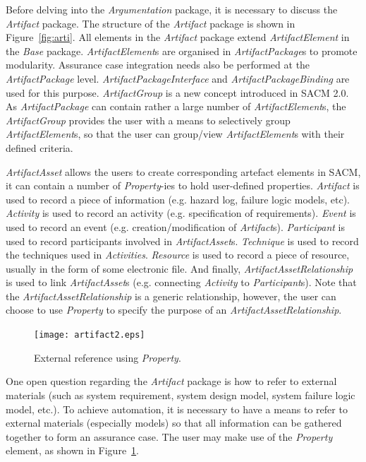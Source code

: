Before delving into the \textit{Argumentation} package, it is necessary to discuss the \textit{Artifact} package. The structure of the \textit{Artifact} package is shown in Figure~\ref{fig:arti}. 
All elements in the \textit{Artifact} package extend \textit{ArtifactElement} in the \textit{Base} package. \textit{ArtifactElement}s are organised in \textit{ArtifactPackage}s to promote modularity. 
Assurance case integration needs also be performed at the \textit{ArtifactPackage} level. 
\textit{ArtifactPackageInterface} and \textit{ArtifactPackageBinding} are used for this purpose.
\textit{ArtifactGroup} is a new concept introduced in SACM 2.0. 
As \textit{ArtifactPackage} can contain rather a large number of \textit{ArtifactElement}s, the \textit{ArtifactGroup} provides the user with a means to selectively group \textit{ArtifactElement}s, so that the user can group/view \textit{ArtifactElement}s with their defined criteria.

\textit{ArtifactAsset} allows the users to create corresponding artefact elements in SACM, it can contain a number of \textit{Property}-ies to hold user-defined properties. \textit{Artifact} is used to record a piece of information (e.g. hazard log, failure logic models, etc). 
\textit{Activity} is used to record an activity (e.g. specification of requirements). 
\textit{Event} is used to record an event (e.g. creation/modification of \textit{Artifact}s). 
\textit{Participant} is used to record participants involved in \textit{ArtifactAsset}s. 
\textit{Technique} is used to record the techniques used in \textit{Activities}. 
\textit{Resource} is used to record a piece of resource, usually in the form of some electronic file. 
And finally, \textit{ArtifactAssetRelationship} is used to link \textit{ArtifactAsset}s (e.g. connecting \textit{Activity} to \textit{Participant}s). 
Note that the \textit{ArtifactAssetRelationship} is a generic relationship, however, the user can choose to use \textit{Property} to specify the purpose of an \textit{ArtifactAssetRelationship}. 

\begin{figure}
	\centering
	\texttt{[image: artifact2.eps]}
	\caption{External reference using \textit{Property}.}
	\label{fig:artifact1}
\end{figure}

One open question regarding the \textit{Artifact} package is how to refer to external materials (such as system requirement, system design model, system failure logic model, etc.). 
To achieve automation, it is necessary to have a means to refer to external materials (especially models) so that all information can be gathered together to form an assurance case. 
The user may make use of the \textit{Property} element, as shown in Figure~\ref{fig:artifact1}.

